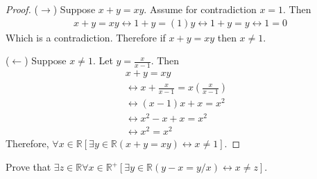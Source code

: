 \begin{proof}
    ($\rightarrow$) Suppose $x + y = xy$. Assume for contradiction
    $x = 1$. Then 
    \begin{align*}
        x + y = xy \leftrightarrow 1 + y = (1)y \leftrightarrow 1 + y = y \leftrightarrow 1 = 0
    \end{align*}
    Which is a contradiction. Therefore if $x + y = xy$ then $x \not = 1$.

    ($\leftarrow$) Suppose $x \not = 1$. Let $y = \frac{x}{x - 1}$. Then 
    \begin{align*}
         & x + y = xy                                               &  & \\
         & \leftrightarrow x + \frac{x}{x - 1} = x(\frac{x}{x - 1}) &  & \\
         & \leftrightarrow (x - 1)x + x = x^2                       &  & \\
         & \leftrightarrow x^2 - x + x = x^2                        &  & \\
         & \leftrightarrow x^2 = x^2
    \end{align*}
    Therefore, $\forall{x \in \mathbb{R}}[\exists{y \in \mathbb{R}}(x + y = xy) \leftrightarrow x \not = 1]$.
\end{proof}

\begin{tcolorbox}[title=Problem 14, breakable]
    Prove that $\exists{z} \in \mathbb{R} \forall{x} \in \mathbb{R^{+}}
        [\exists{y} \in \mathbb{R}(y - x = y / x) \leftrightarrow x \not = z]$.
\end{tcolorbox}

